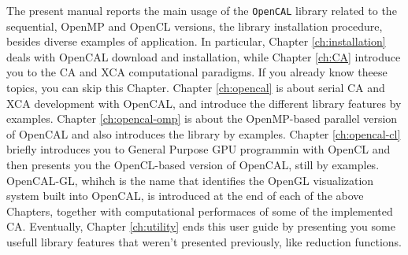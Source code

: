 The present manual reports the main usage of the \verb'OpenCAL'
library related to the sequential, OpenMP and OpenCL versions, the
library installation procedure, besides diverse examples of
application. In particular, Chapter \ref{ch:installation} deals with
OpenCAL download and installation, while Chapter \ref{ch:CA} introduce
you to the CA and XCA computational paradigms. If you already know
theese topics, you can skip this Chapter. Chapter \ref{ch:opencal} is
about serial CA and XCA development with OpenCAL, and introduce the
different library features by examples. Chapter \ref{ch:opencal-omp}
is about the OpenMP-based parallel version of OpenCAL and also
introduces the library by examples. Chapter \ref{ch:opencal-cl}
briefly introduces you to General Purpose GPU programmin with OpenCL
and then presents you the OpenCL-based version of OpenCAL, still by
examples. OpenCAL-GL, whihch is the name that identifies the OpenGL
visualization system built into OpenCAL, is introduced at the end of
each of the above Chapters, together with computational performaces of
some of the implemented CA. Eventually, Chapter \ref{ch:utility} ends
this user guide by presenting you some usefull library features that
weren't presented previously, like reduction functions.
